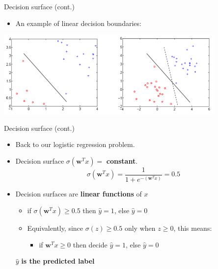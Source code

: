 \documentclass[serif, aspectratio=169]{beamer}
\begin{document}
\begin{frame}{Decision surface (cont.)}

    \begin{itemize}
        \item An example of linear decision boundaries:
    \end{itemize}
    \begin{center}
        \includegraphics[width=0.85\textwidth]{pic/DBoundary.png}
    \end{center}
\end{frame}

\begin{frame}{Decision surface (cont.)}
    \begin{itemize}
      \item Back to our logistic regression problem.
      \item Decision surface $\sigma (\mathbf{w}^Tx) = $ \textbf{constant}.
        \[
            \sigma (\mathbf{w}^Tx) = \frac{1}{1 + e^{-(\mathbf{w}^Tx)}} = 0.5
        \]
      \item Decision surfaces are \textbf{linear functions} of $x$
        \begin{itemize}
            \item if $\sigma (\mathbf{w}^Tx) \geq 0.5$ then $\hat{y}=1$, else $\hat{y} = 0$
            \item Equivalently, since $\sigma(z) \ge 0.5$ only when $z \ge 0$, this means:
            \begin{itemize}
                \item if $\mathbf{w}^Tx \geq 0$ then decide $\hat{y}=1$, else $\hat{y}=0$
            \end{itemize}
        \end{itemize}%
        \vfill
        \begin{center}
            \( \hat{y} \) \textbf{is the predicted label}
        \end{center}
    \end{itemize}
\end{frame}
\end{document}

